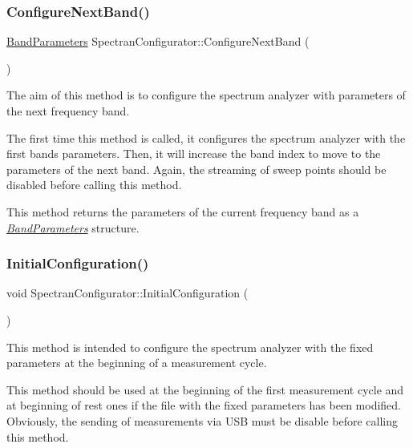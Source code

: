 \subsubsection{\texorpdfstring{Configure\+Next\+Band()}{ConfigureNextBand()}}
{\footnotesize\ttfamily \hyperlink{structBandParameters}{Band\+Parameters} Spectran\+Configurator\+::\+Configure\+Next\+Band (\begin{DoxyParamCaption}{ }\end{DoxyParamCaption})}



The aim of this method is to configure the spectrum analyzer with parameters of the next frequency band. 

The first time this method is called, it configures the spectrum analyzer with the first band\textquotesingle{}s parameters. Then, it will increase the band index to move to the parameters of the next band. Again, the streaming of sweep points should be disabled before calling this method.

This method returns the parameters of the current frequency band as a {\itshape \hyperlink{structBandParameters}{Band\+Parameters}} structure. \mbox{\label{classSpectranConfigurator_ad2deb73f4c1691cd8bff29b810f8f42b}} 
\subsubsection{\texorpdfstring{Initial\+Configuration()}{InitialConfiguration()}}
{\footnotesize\ttfamily void Spectran\+Configurator\+::\+Initial\+Configuration (\begin{DoxyParamCaption}{ }\end{DoxyParamCaption})}



This method is intended to configure the spectrum analyzer with the fixed parameters at the beginning of a measurement cycle. 

This method should be used at the beginning of the first measurement cycle and at beginning of rest ones if the file with the fixed parameters has been modified. Obviously, the sending of measurements via U\+SB must be disable before calling this method. \mbox{\label{classSpectranConfigurator_a9171d48390718bd6f2d05922ee6596cd}} 
